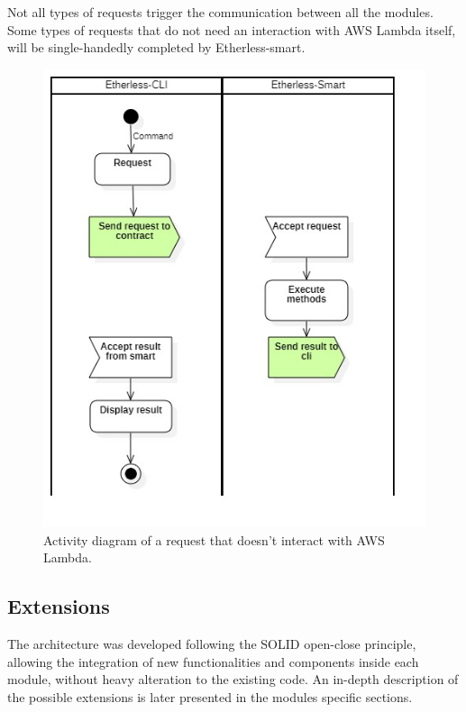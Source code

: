 	Not all types of requests trigger the communication between all the modules. Some types of requests that do not need an interaction with AWS Lambda itself, will be single-handedly completed by Etherless-smart.
	\begin{figure} [h!]
		\centering
		\includegraphics[width=0.8\linewidth]{diagrammi/generali/activity_diag_pattern1}
		\caption{Activity diagram of a request that doesn't interact with AWS Lambda.}
	\end{figure}
	\pagebreak
	\subsection{Extensions} %
	The architecture was developed following the SOLID open-close principle, allowing the integration of new functionalities and components inside each module, without heavy alteration to the existing code. An in-depth description of the possible extensions is later presented in the modules specific sections.
